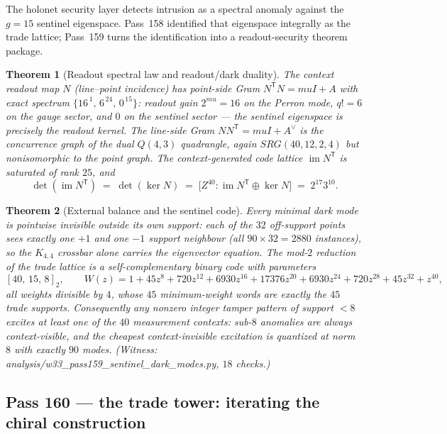\documentclass[12pt,a4paper]{article}
\def\mathbb#1{#1}%
\def\mathrm#1{#1}%
\def\texttt#1{#1}%
\def\mu{mu}%
\newtheorem{theorem}{Theorem}[section]
\theoremstyle{definition}
\newcommand{\SRG}{\mathrm{SRG}}
\begin{document}
The holonet security layer detects intrusion as a spectral anomaly against
the $g=15$ sentinel eigenspace. Pass~158 identified that eigenspace
integrally as the trade lattice; Pass~159 turns the identification into a
readout-security theorem package.

\begin{theorem}[Readout spectral law and readout/dark duality]
\label{thm:readout-law}
The context readout map $N$ (line--point incidence) has point-side Gram
$N^{\mathsf T}N=\mu I+A$ with exact spectrum
$\{16^{\,1},\,6^{\,24},\,0^{\,15}\}$: readout gain $2^{\mu}=16$ on the
Perron mode, $q!=6$ on the gauge sector, and $0$ on the sentinel sector ---
the sentinel eigenspace is precisely the readout kernel. The line-side Gram
$NN^{\mathsf T}=\mu I+A^{\vee}$ is the concurrence graph of the dual
$Q(4,3)$ quadrangle, again $\SRG(40,12,2,4)$ but nonisomorphic to the
point graph. The context-generated code lattice
$\operatorname{im}N^{\mathsf T}$ is saturated of rank $25$, and
\[
  \det(\operatorname{im}N^{\mathsf T})
  \;=\;\det(\ker N)
  \;=\;\bigl[\mathbb Z^{40}:\operatorname{im}N^{\mathsf T}\oplus\ker N\bigr]
  \;=\;2^{17}3^{10}.
\]
\end{theorem}

\begin{theorem}[External balance and the sentinel code]
\label{thm:sentinel-code}
Every minimal dark mode is pointwise invisible outside its own support:
each of the $32$ off-support points sees exactly one $+1$ and one $-1$
support neighbour (all $90\times32=2880$ instances), so the $K_{4,4}$
crossbar alone carries the eigenvector equation. The mod-$2$ reduction of
the trade lattice is a self-complementary binary code with parameters
\[
  [40,\,15,\,8]_2,
  \qquad
  W(z)=1+45z^{8}+720z^{12}+6930z^{16}+17376z^{20}
  +6930z^{24}+720z^{28}+45z^{32}+z^{40},
\]
all weights divisible by $4$, whose $45$ minimum-weight words are exactly
the $45$ trade supports. Consequently \emph{any nonzero integer tamper
pattern of support $<8$ excites at least one of the $40$ measurement
contexts}: sub-$8$ anomalies are always context-visible, and the cheapest
context-invisible excitation is quantized at norm $8$ with exactly $90$
modes. (Witness:
\texttt{analysis/w33\_pass159\_sentinel\_dark\_modes.py}, $18$ checks.)
\end{theorem}

\subsection{Pass 160 --- the trade tower: iterating the chiral construction}
\label{ssec:pass160}
\end{document}
